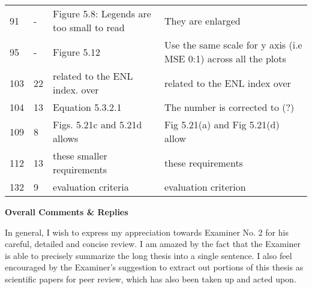 \begin{longtable}[c]{p{}|p{}|p{}|p{}}
91 & - & Figure 5.8: Legends are too small to read & They are enlarged \\
95 & - & Figure 5.12 & Use the same scale for  y axis (i.e MSE 0:1) across all the plots \\
103 & 22 & related to the ENL index. over & related to the ENL index over \\
104 & 13 & Equation 5.3.2.1 & The number is corrected to (?) \\
109 & 8 & Figs. 5.21c and 5.21d allows & Fig 5.21(a) and Fig 5.21(d) allow \\
112 & 13 & these smaller requirements & these requirements \\
132 & 9 & evaluation criteria & evaluation criterion
\end{longtable}    

\textbf{Overall Comments \& Replies}

In general, I wish to express my appreciation towards Examiner No. 2 for his careful, detailed and concise review.
I am amazed by the fact that the Examiner is able to precisely summarize the long thesis into a single sentence.
I also feel encouraged by the Examiner's suggestion to extract out portions of this thesis as scientific papers for peer review, which has also been taken up and acted upon.

